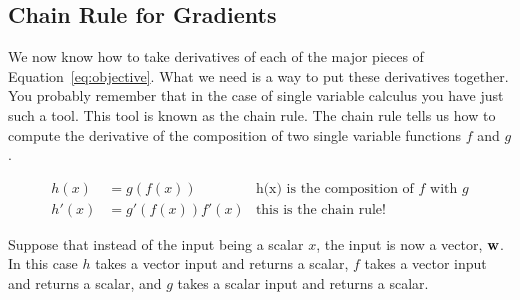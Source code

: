 \documentclass[assignment03_Solutions]{subfiles}
\begin{document}
\begin{exercise}[(60 minutes)]
\begin{boxedsolution}
\end{boxedsolution}
%
%
%

\ees

\end{exercise}

\subsection{Chain Rule for Gradients}
We now know how to take derivatives of each of the major pieces of Equation~\ref{eq:objective}.  What we need is a way to put these derivatives together.  You probably remember that in the case of single variable calculus you have just such a tool.  This tool is known as the chain rule.  The chain rule tells us how to compute the derivative of the composition of two single variable functions $f$ and $g$.  

\begin{align}
h(x)&= g(f(x))&\mbox{h(x) is the composition of $f$ with $g$} \nonumber \\
h'(x) &= g'(f(x))f'(x)&\mbox{this is the chain rule!}
\end{align}

Suppose that instead of the input being a scalar $x$, the input is now a vector, $\mathbf{w}$.  In this case $h$ takes a vector input and returns a scalar, $f$ takes a vector input and returns a scalar, and $g$ takes a scalar input and returns a scalar.
\end{document}
